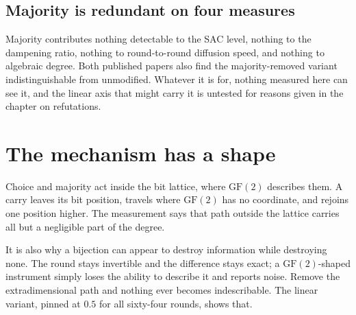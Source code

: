 \subsection{Majority is redundant on four measures}

Majority contributes nothing detectable to the SAC level, nothing to the dampening ratio, nothing to round-to-round diffusion speed, and nothing to algebraic degree. Both published papers also find the majority-removed variant indistinguishable from unmodified. Whatever it is for, nothing measured here can see it, and the linear axis that might carry it is untested for reasons given in the chapter on refutations.

\section{The mechanism has a shape}

Choice and majority act inside the bit lattice, where \(\mathrm{GF}(2)\) describes them. A carry leaves its bit position, travels where \(\mathrm{GF}(2)\) has no coordinate, and rejoins one position higher. The measurement says that path outside the lattice carries all but a negligible part of the degree.

It is also why a bijection can appear to destroy information while destroying none. The round stays invertible and the difference stays exact; a \(\mathrm{GF}(2)\)-shaped instrument simply loses the ability to describe it and reports noise. Remove the extradimensional path and nothing ever becomes indescribable. The linear variant, pinned at \(0.5\) for all sixty-four rounds, shows that.
